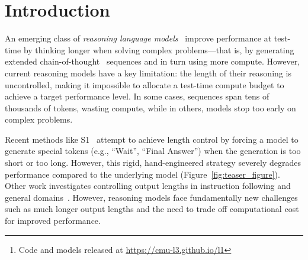 \begin{abstract}
  Reasoning language models have shown an uncanny ability to improve performance at test-time by ``thinking longer''—that is, by generating longer chain-of-thought sequences and hence using more compute.
However, the length of their chain-of-thought reasoning is not controllable, making it impossible to allocate test-time compute to achieve a desired level of performance.
We introduce 
Length Controlled Policy Optimization (\ours{}),  a simple reinforcement learning method that optimizes for accuracy and adherence to user-specified length constraints.
We use \ours{} to train \model{}, a reasoning language model that produces outputs satisfying a length constraint given in its prompt.
\model{}'s length control allows for smoothly trading off computational cost and accuracy on a wide range of tasks, and outperforms the state-of-the-art S1 method for length control.
Furthermore, we uncover an unexpected short chain-of-thought capability in models trained with \ours{}. For instance, our 1.5B \model{} model surpasses GPT-4o at equal reasoning lengths.
Overall, \ours{} enables precise control over reasoning length, allowing for fine-grained allocation of test-time compute and accuracy.\footnote{Code and models released at \url{https://cmu-l3.github.io/l1}}
\end{abstract}

\section{Introduction}


An emerging class of \textit{reasoning language models}~\citep{openai2024openaio1card,deepseekai2025deepseekr1incentivizingreasoningcapability} improve performance at test-time by thinking longer when solving complex problems—that is,  by generating extended chain-of-thought~\citep{wei2023chainofthoughtpromptingelicitsreasoning} sequences and in turn using more compute.
However, current reasoning models have a key limitation: the length of their reasoning is uncontrolled, making it impossible to allocate a test-time compute budget to achieve a target performance level.
In some cases, sequences span tens of thousands of tokens, wasting compute, while in others, models stop too early on complex problems.


Recent methods like S1~\citep{muennighoff2025s1simpletesttimescaling} attempt to achieve length control by forcing a model to generate special tokens (e.g., ``Wait'', ``Final Answer'') when the generation is too short or too long.
However, this rigid, hand-engineered strategy severely degrades  performance compared to the underlying model (Figure~\ref{fig:teaser_figure}).
Other work investigates controlling output lengths in instruction following and general domains~\citep{butcher2024preciselengthcontrollarge,yuan2024followinglengthconstraintsinstructions}. 
However, reasoning models face  fundamentally new challenges such as much longer output lengths and the need to trade off computational cost for improved performance.


